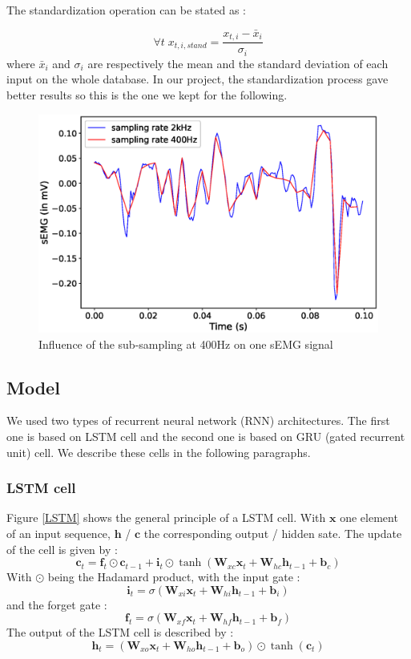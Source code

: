 \documentclass[final]{cvpr}
\begin{document}
The standardization operation can be stated as :

$$\forall t \; x_{t,i,stand}=\frac{x_{t,i}-\bar{x}_{i}}{\sigma_i}$$
where $\bar{x}_{i}$ and $\sigma_i$ are respectively the mean and the standard deviation of each input on the whole database. In our project, the standardization process gave better results so this is the one we kept for the following.

\begin{figure}[t]
	\begin{center}
		\includegraphics[width=\linewidth]{subsampling.eps}
	\end{center}
	\caption{Influence of the sub-sampling at 400Hz on one sEMG signal}
	\label{sub-sampling}
\end{figure}
 
\subsection{Model}

We used two types of recurrent neural network (RNN) architectures. The first one is based on LSTM cell and the second one is based on GRU (gated recurrent unit) cell. We describe these cells in the following paragraphs.
\subsubsection*{LSTM cell}
Figure \ref{LSTM} shows the general principle of a LSTM cell. With $\pmb{x}$ one element of an input sequence, $\pmb{h}$ / $\pmb{c}$ the corresponding output / hidden sate. The update of the cell is given by : \\
$$\pmb{c}_t=\pmb{f}_t\odot \pmb{c}_{t-1}+\pmb{i}_t\odot\tanh(\pmb{W}_{xc}\pmb{x}_t+\pmb{W}_{hc}\pmb{h}_{t-1}+\pmb{b}_c)$$
With $\odot$ being the Hadamard product, with the input gate :
$$\pmb{i}_t=\sigma(\pmb{W}_{xi}\pmb{x}_t+\pmb{W}_{hi}\pmb{h}_{t-1}+\pmb{b}_i)$$
and the forget gate :
$$\pmb{f}_t=\sigma(\pmb{W}_{xf}\pmb{x}_t+\pmb{W}_{hf}\pmb{h}_{t-1}+\pmb{b}_f)$$
The output of the LSTM cell is described by : 
$$\pmb{h}_t=(\pmb{W}_{xo}\pmb{x}_t+\pmb{W}_{ho}\pmb{h}_{t-1}+\pmb{b}_o)\odot\tanh(\pmb{c}_t)$$
\end{document}

